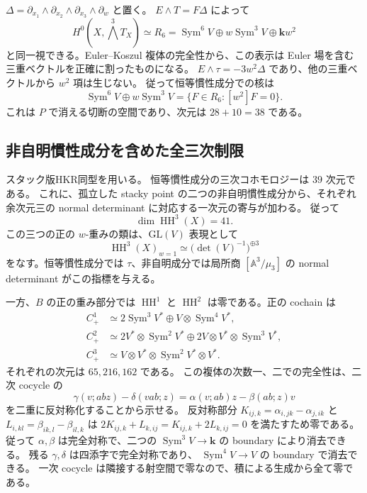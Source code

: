 $\Delta=\partial_{x_1}\wedge\partial_{x_2}\wedge
\partial_{x_3}\wedge\partial_w$ と置く。
$E\wedge T=F\Delta$ によって
\[
 H^0(X,\textstyle\bigwedge^3T_X)\simeq R_6
 =\operatorname{Sym}^6V\oplus w\operatorname{Sym}^3V\oplus\mathbf k w^2
\]
と同一視できる。Euler--Koszul 複体の完全性から、この表示は Euler 場を含む
三重ベクトルを正確に割ったものになる。
$E\wedge\tau=-3w^2\Delta$ であり、他の三重ベクトルから $w^2$ 項は生じない。
従って恒等慣性成分での核は
\[
 \operatorname{Sym}^6V\oplus w\operatorname{Sym}^3V
 =\{F\in R_6:[w^2]F=0\}.
\]
これは $P$ で消える切断の空間であり、次元は $28+10=38$ である。

\subsection{非自明慣性成分を含めた全三次制限}

スタック版HKR同型\cite[Corollary 1.4]{FPSS}を用いる。
恒等慣性成分の三次コホモロジーは $39$ 次元である。
これに、孤立した stacky point の二つの非自明慣性成分から、それぞれ
余次元三の normal determinant に対応する一次元の寄与が加わる。
従って
\[
 \dim\operatorname{HH}^3(X)=41.
\]
この三つの正の $w$-重みの類は、$\mathrm{GL}(V)$ 表現として
\[
 \operatorname{HH}^3(X)_{w=1}\simeq\bigl(\det(V)^{-1}\bigr)^{\oplus3}
\]
をなす。恒等慣性成分では $\tau$、非自明成分では局所商
$[\mathbb A^3/\mu_3]$ の normal determinant がこの指標を与える。

一方、$B$ の正の重み部分では $\operatorname{HH}^1$ と
$\operatorname{HH}^2$ は零である。正の cochain は
\[
\begin{aligned}
 C^1_+&\simeq2\operatorname{Sym}^3V^*
                  \oplus V\otimes\operatorname{Sym}^4V^*,\\
 C^2_+&\simeq2V^*\otimes\operatorname{Sym}^2V^*
                  \oplus2V\otimes V^*\otimes\operatorname{Sym}^3V^*,\\
 C^3_+&\simeq V\otimes V^*\otimes\operatorname{Sym}^2V^*\otimes V^*.
\end{aligned}
\]
それぞれの次元は $65,216,162$ である。
この複体の次数一、二での完全性は、二次 cocycle の
\[
 \gamma(v;abz)-\delta(vab;z)=\alpha(v;ab)z-\beta(ab;z)v
\]
を二重に反対称化することから示せる。
反対称部分 $K_{ij,k}=\alpha_{i,jk}-\alpha_{j,ik}$ と
$L_{i,kl}=\beta_{ik,l}-\beta_{il,k}$ は
$2K_{ij,k}+L_{k,ij}=K_{ij,k}+2L_{k,ij}=0$ を満たすため零である。
従って $\alpha,\beta$ は完全対称で、二つの
$\operatorname{Sym}^3V\to\mathbf k$ の boundary により消去できる。
残る $\gamma,\delta$ は四添字で完全対称であり、
$\operatorname{Sym}^4V\to V$ の boundary で消去できる。
一次 cocycle は隣接する射空間で零なので、積による生成から全て零である。

